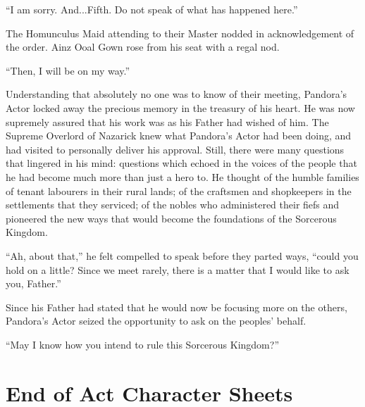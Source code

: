  

“I am sorry. And...Fifth. Do not speak of what has happened here.”

 

The Homunculus Maid attending to their Master nodded in acknowledgement of the order. Ainz Ooal Gown rose from his seat with a regal nod.

 

“Then, I will be on my way.”

 

Understanding that absolutely no one was to know of their meeting, Pandora’s Actor locked away the precious memory in the treasury of his heart. He was now supremely assured that his work was as his Father had wished of him. The Supreme Overlord of Nazarick knew what Pandora’s Actor had been doing, and had visited to personally deliver his approval. Still, there were many questions that lingered in his mind: questions which echoed in the voices of the people that he had become much more than just a hero to. He thought of the humble families of tenant labourers in their rural lands; of the craftsmen and shopkeepers in the settlements that they serviced; of the nobles who administered their fiefs and pioneered the new ways that would become the foundations of the Sorcerous Kingdom.

 

“Ah, about that,” he felt compelled to speak before they parted ways, “could you hold on a little? Since we meet rarely, there is a matter that I would like to ask you, Father.”

 

Since his Father had stated that he would now be focusing more on the others, Pandora’s Actor seized the opportunity to ask on the peoples’ behalf.

“May I know how you intend to rule this Sorcerous Kingdom?”

\section*{End of Act Character Sheets}

